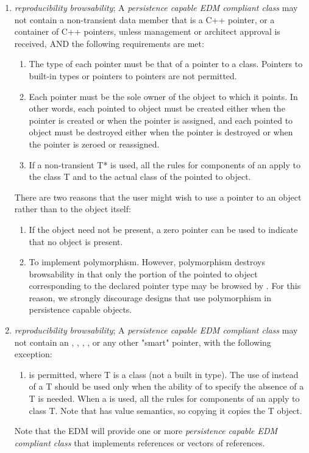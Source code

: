 \documentclass[draftmode]{memarticle}
\newcommand{\Root}{\productname{Root}}
\newcommand{\EDProduct}{\classname{ED\-Product}}
\begin{document}
\begin{enumerate}
	\item \emph{reproducibility} \emph{browsability}; A \emph{persistence capable EDM compliant class} may not contain a non-transient data member that is a C++ pointer, or a container of C++ pointers, unless management or architect approval is received, AND the following requirements are met:
	\begin{enumerate}
		\item The type of each pointer must be that of a pointer to a class.  Pointers to built-in types or pointers to pointers are not permitted.
		\item Each pointer must be the sole owner of the object to which it points.  In other words, each pointed to object must be created either when the pointer is created or when the pointer is assigned, and each pointed to object must be destroyed either when the pointer is destroyed or when the pointer is zeroed or reassigned.
		\item If a non-transient T* is used, all the rules for components of an \EDProduct apply to the class T and to the actual class of the pointed to object.
	\end{enumerate}
There are two reasons that the user might wish to use a pointer to an object rather than to the object itself:
	\begin{enumerate}
                \item If the object need not be present, a zero pointer can be used to indicate that no object is present.
		\item To implement polymorphism. However, polymorphism destroys browsability in that only the portion of the pointed to object corresponding to the declared pointer type may be browsed by \Root. For this reason, we strongly discourage designs that use polymorphism in persistence capable objects.
	\end{enumerate}

	\item \emph{reproducibility} \emph{browsability}; A \emph{persistence capable EDM compliant class} may not contain an , , , \Root {}, or any other "smart" pointer, with the following exception:
		\begin{enumerate}
			\item {} is permitted, where T is a class (not a built in type).  The use of  instead of a T should be used only when the ability of  to specify the absence of a T is needed.  When a  is used, all the rules for components of an \EDProduct apply to class T.  Note that  has value semantics, so copying it copies the T object.
		\end{enumerate}
Note that the EDM will provide one or more \emph{persistence capable EDM compliant class} that implements references or vectors of references.


\end{enumerate}
\end{document}
